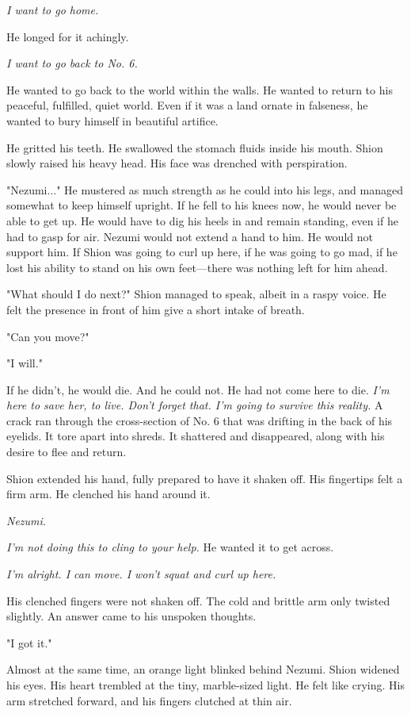 \emph{I want to go home.}

He longed for it achingly.

\emph{I want to go back to No. 6.}

He wanted to go back to the world within the walls. He wanted to return
to his peaceful, fulfilled, quiet world. Even if it was a land ornate in
falseness, he wanted to bury himself in beautiful artifice.

He gritted his teeth. He swallowed the stomach fluids inside his mouth.
Shion slowly raised his heavy head. His face was drenched with
perspiration.

"Nezumi..." He mustered as much strength as he could into his legs, and
managed somewhat to keep himself upright. If he fell to his knees now,
he would never be able to get up. He would have to dig his heels in and
remain standing, even if he had to gasp for air. Nezumi would not extend
a hand to him. He would not support him. If Shion was going to curl up
here, if he was going to go mad, if he lost his ability to stand on his
own feet---there was nothing left for him ahead.

"What should I do next?" Shion managed to speak, albeit in a raspy
voice. He felt the presence in front of him give a short intake of
breath.

"Can you move?"

"I will."

If he didn't, he would die. And he could not. He had not come here to
die. \emph{I'm here to save her, to live. Don't forget that. I'm going to
survive this reality.} A crack ran through the cross-section of No. 6
that was drifting in the back of his eyelids. It tore apart into shreds.
It shattered and disappeared, along with his desire to flee and return.

Shion extended his hand, fully prepared to have it shaken off. His
fingertips felt a firm arm. He clenched his hand around it.

\emph{Nezumi.}

\emph{I'm not doing this to cling to your help.} He wanted it to get across.

\emph{I'm alright. I can move. I won't squat and curl up here.}

His clenched fingers were not shaken off. The cold and brittle arm only
twisted slightly. An answer came to his unspoken thoughts.

"I got it."

Almost at the same time, an orange light blinked behind Nezumi. Shion
widened his eyes. His heart trembled at the tiny, marble-sized light. He
felt like crying. His arm stretched forward, and his fingers clutched at
thin air.

